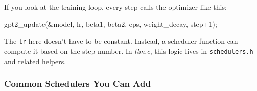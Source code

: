 \documentclass[
  letterpaper,
  DIV=11,
  numbers=noendperiod]{scrreprt}
\newenvironment{Shaded}{\begin{snugshade}}{\end{snugshade}}
\newcommand{\DecValTok}[1]{\textcolor[rgb]{0.68,0.00,0.00}{#1}}
\newcommand{\NormalTok}[1]{\textcolor[rgb]{0.00,0.23,0.31}{#1}}
\newcommand{\OperatorTok}[1]{\textcolor[rgb]{0.37,0.37,0.37}{#1}}
\begin{document}
If you look at the training loop, every step calls the optimizer like
this:

\begin{Shaded}
\begin{Highlighting}[]
\NormalTok{gpt2\_update}\OperatorTok{(\&}\NormalTok{model}\OperatorTok{,}\NormalTok{ lr}\OperatorTok{,}\NormalTok{ beta1}\OperatorTok{,}\NormalTok{ beta2}\OperatorTok{,}\NormalTok{ eps}\OperatorTok{,}\NormalTok{ weight\_decay}\OperatorTok{,}\NormalTok{ step}\OperatorTok{+}\DecValTok{1}\OperatorTok{);}
\end{Highlighting}
\end{Shaded}

The \texttt{lr} here doesn't have to be constant. Instead, a scheduler
function can compute it based on the step number. In \emph{llm.c}, this
logic lives in \texttt{schedulers.h} and related helpers.

\subsubsection{Common Schedulers You Can
Add}\label{common-schedulers-you-can-add}
\end{document}
